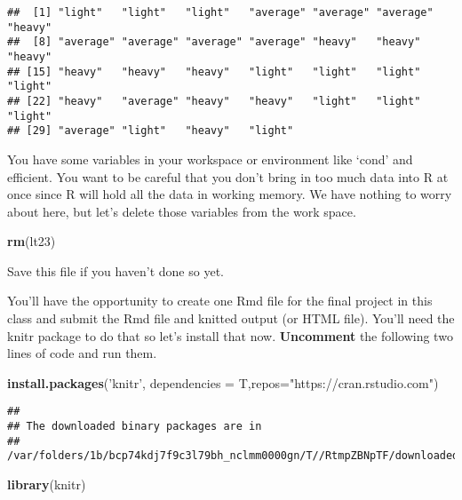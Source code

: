 \documentclass[]{article}
\newenvironment{Shaded}{\begin{snugshade}}{\end{snugshade}}
\newcommand{\KeywordTok}[1]{\textcolor[rgb]{0.13,0.29,0.53}{\textbf{#1}}}
\newcommand{\DataTypeTok}[1]{\textcolor[rgb]{0.13,0.29,0.53}{#1}}
\newcommand{\StringTok}[1]{\textcolor[rgb]{0.31,0.60,0.02}{#1}}
\newcommand{\NormalTok}[1]{#1}
\begin{document}
\begin{verbatim}
##  [1] "light"   "light"   "light"   "average" "average" "average" "heavy"  
##  [8] "average" "average" "average" "average" "heavy"   "heavy"   "heavy"  
## [15] "heavy"   "heavy"   "heavy"   "light"   "light"   "light"   "light"  
## [22] "heavy"   "average" "heavy"   "heavy"   "light"   "light"   "light"  
## [29] "average" "light"   "heavy"   "light"
\end{verbatim}

You have some variables in your workspace or environment like `cond' and
efficient. You want to be careful that you don't bring in too much data
into R at once since R will hold all the data in working memory. We have
nothing to worry about here, but let's delete those variables from the
work space.

\begin{Shaded}
\begin{Highlighting}[]
\KeywordTok{rm}\NormalTok{(lt23)}
\end{Highlighting}
\end{Shaded}

Save this file if you haven't done so yet.

You'll have the opportunity to create one Rmd file for the final project
in this class and submit the Rmd file and knitted output (or HTML file).
You'll need the knitr package to do that so let's install that now.
\textbf{Uncomment} the following two lines of code and run them.

\begin{Shaded}
\begin{Highlighting}[]
 \KeywordTok{install.packages}\NormalTok{(}\StringTok{'knitr'}\NormalTok{, }\DataTypeTok{dependencies =}\NormalTok{ T,}\DataTypeTok{repos=}\StringTok{"https://cran.rstudio.com"}\NormalTok{)}
\end{Highlighting}
\end{Shaded}

\begin{verbatim}
## 
## The downloaded binary packages are in
##  /var/folders/1b/bcp74kdj7f9c3l79bh_nclmm0000gn/T//RtmpZBNpTF/downloaded_packages
\end{verbatim}

\begin{Shaded}
\begin{Highlighting}[]
 \KeywordTok{library}\NormalTok{(knitr)}
\end{Highlighting}
\end{Shaded}
\end{document}
